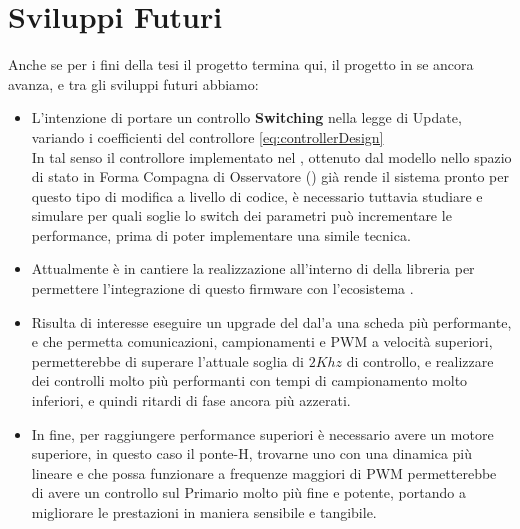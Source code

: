 \section*{Sviluppi Futuri}
Anche se per i fini della tesi il progetto termina qui, il progetto in se ancora avanza, e tra gli sviluppi futuri abbiamo:
\begin{itemize}
	\item L'intenzione di portare un controllo \textbf{Switching} nella legge di Update, variando i coefficienti del controllore \ref{eq:controllerDesign}\\
	      In tal senso il controllore implementato nel \microControllore, ottenuto dal modello nello spazio di stato in Forma Compagna di Osservatore (\cite{FormeCanoniche}) già rende il sistema pronto per questo tipo di modifica a livello di codice, è necessario tuttavia studiare e simulare per quali soglie lo switch dei parametri può incrementare le performance, prima di poter implementare una simile tecnica.
	\item Attualmente è in cantiere la realizzazione all'interno di \MARTe della libreria \cite*{EMP} per permettere l'integrazione di questo firmware con l'ecosistema \MARTe.
	\item Risulta di interesse eseguire un upgrade del \microControllore dal'\ArduinoUno a una scheda più performante, e che permetta comunicazioni, campionamenti e PWM a velocità superiori, permetterebbe di superare l'attuale soglia di $ 2Khz $ di controllo, e realizzare dei controlli molto più performanti con tempi di campionamento molto inferiori, e quindi ritardi di fase ancora più azzerati.
	\item In fine, per raggiungere performance superiori è necessario avere un motore superiore, in questo caso il ponte-H, trovarne uno con una dinamica più lineare e che possa funzionare a frequenze maggiori di PWM permetterebbe di avere un controllo sul Primario molto più fine e potente, portando a migliorare le prestazioni in maniera sensibile e tangibile.

\end{itemize}




